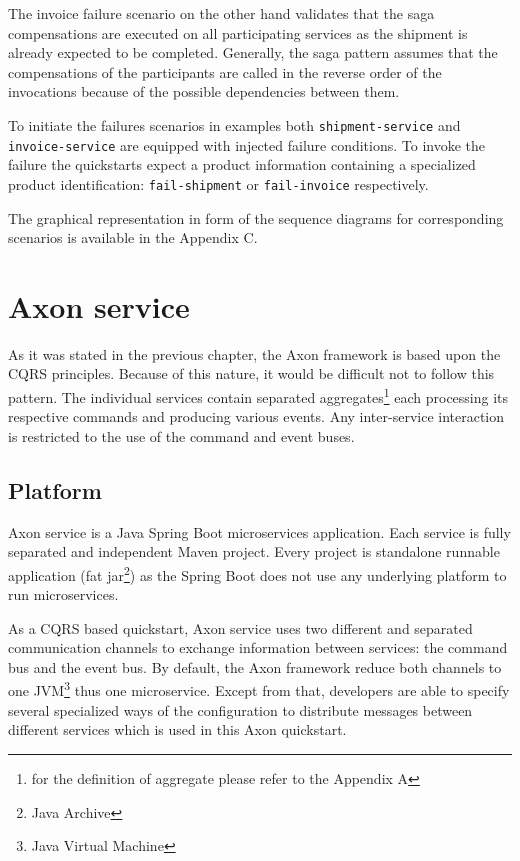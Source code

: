 \documentclass[oneside,
  digital, %
  table,   %
  nolof,     %
  nolot,     %
]{fithesis3}
\begin{document}
The invoice failure scenario on the other hand validates that the saga compensations are executed on all participating services as the shipment is already expected to be completed. Generally, the saga pattern assumes that the compensations of the participants are called in the reverse order of the invocations because of the possible dependencies between them.

To initiate the failures scenarios in examples both \texttt{shipment-service} and \texttt{invoice-service} are equipped with injected failure conditions. To invoke the failure the quickstarts expect a product information containing a specialized product identification: \texttt{fail-shipment} or \texttt{fail-invoice} respectively. 

The graphical representation in form of the sequence diagrams for corresponding scenarios is available in the Appendix C.

\section{Axon service}

As it was stated in the previous chapter, the Axon framework is based upon the CQRS principles. Because of this nature, it would be difficult not to follow this pattern. The individual services contain separated aggregates\footnote{for the definition of aggregate please refer to the Appendix A} each processing its respective commands and producing various events. Any inter-service interaction is restricted to the use of the command and event buses.

\subsection{Platform}

Axon service is a Java Spring Boot microservices application. Each service is fully separated and independent Maven\cite{maven} project. Every project is standalone runnable application (fat jar\footnote{Java Archive}) as the Spring Boot does not use any underlying platform to run microservices.

As a CQRS based quickstart, Axon service uses two different and separated communication channels to exchange information between services: the command bus and the event bus. By default, the Axon framework reduce both channels to one JVM\footnote{Java Virtual Machine} thus one microservice. Except from that, developers are able to specify several specialized ways of the configuration to distribute messages between different services which is used in this Axon quickstart.
\end{document}
